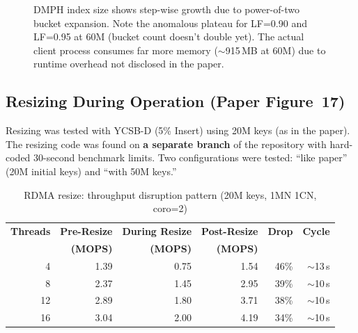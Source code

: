\documentclass[conference]{IEEEtran}
\begin{document}
\begin{figure}[H]
\centering
{}
\caption{DMPH index size shows step-wise growth due to power-of-two bucket expansion. Note the anomalous plateau for LF=0.90 and LF=0.95 at 60M (bucket count doesn't double yet). The actual client process consumes far more memory ($\sim$915\,MB at 60M) due to runtime overhead not disclosed in the paper.}
\label{fig:rdma-memory}
\end{figure}

\subsection{Resizing During Operation (Paper Figure~17)}\label{sec:repro-resize}

Resizing was tested with YCSB-D (5\% Insert) using 20M keys (as in the paper). The resizing code was found on \textbf{a separate branch} of the repository with hard-coded 30-second benchmark limits. Two configurations were tested: ``like paper'' (20M initial keys) and ``with 50M keys.''

\begin{table}[H]
\centering
\caption{RDMA resize: throughput disruption pattern (20M keys, 1MN 1CN, coro=2)}
\label{tab:rdma-resize}
\small
\begin{tabular}{@{}rrrrrr@{}}
\toprule
\textbf{Threads} & \textbf{Pre-Resize} & \textbf{During Resize} & \textbf{Post-Resize} & \textbf{Drop} & \textbf{Cycle} \\
 & \textbf{(MOPS)} & \textbf{(MOPS)} & \textbf{(MOPS)} & & \\
\midrule
4  & 1.39 & 0.75 & 1.54 & 46\% & $\sim$13\,s \\
8  & 2.37 & 1.45 & 2.95 & 39\% & $\sim$10\,s \\
12 & 2.89 & 1.80 & 3.71 & 38\% & $\sim$10\,s \\
16 & 3.04 & 2.00 & 4.19 & 34\% & $\sim$10\,s \\
\bottomrule
\end{tabular}
\end{table}
\end{document}
